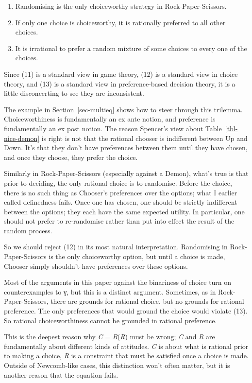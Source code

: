 \documentclass[
  11pt,
  letterpaper,
  DIV=11,
  numbers=noendperiod,
  twoside]{scrartcl}
\providecommand{\tightlist}{%
  \setlength{\itemsep}{0pt}\setlength{\parskip}{0pt}}
\begin{document}
\begin{enumerate}
\def\labelenumi{(\arabic{enumi})}
\setcounter{enumi}{10}
\tightlist
\item
  Randomising is the only choiceworthy strategy in Rock-Paper-Scissors.
\item
  If only one choice is choiceworthy, it is rationally preferred to all
  other choices.
\item
  It is irrational to prefer a random mixture of some choices to every
  one of the choices.
\end{enumerate}

Since (11) is a standard view in game theory, (12) is a standard view in
choice theory, and (13) is a standard view in preference-based decision
theory, it is a little disconcerting to see they are inconsistent.

The example in Section~\ref{sec-multieq} shows how to steer through this
trilemma. Choiceworthiness is fundamentally an ex ante notion, and
preference is fundamentally an ex post notion. The reason Spencer's view
about Table~\ref{tbl-nice-demon} is right is not that the rational
chooser is indifferent between Up and Down. It's that they don't have
preferences between them until they have chosen, and once they choose,
they prefer the choice.

Similarly in Rock-Paper-Scissors (especially against a Demon), what's
true is that prior to deciding, the only rational choice is to
randomise. Before the choice, there is no such thing as Chooser's
preferences over the options; what I earlier called definedness fails.
Once one has chosen, one should be strictly indifferent between the
options; they each have the same expected utility. In particular, one
should not prefer to re-randomise rather than put into effect the result
of the random process.

So we should reject (12) in its most natural interpretation. Randomising
in Rock-Paper-Scissors is the only choiceworthy option, but until a
choice is made, Chooser simply shouldn't have preferences over these
options.

Most of the arguments in this paper against the binariness of choice
turn on counterexamples to γ, but this is a distinct argument.
Sometimes, as in Rock-Paper-Scissors, there are grounds for rational
choice, but no grounds for rational preference. The only preferences
that would ground the choice would violate (13). So rational
choiceworthiness cannot be grounded in rational preference.

This is the deepest reason why \emph{C} = \emph{B}(\emph{R}) must be
wrong; \emph{C} and \emph{R} are fundamentally about different kinds of
attitudes. \emph{C} is about what is rational prior to making a choice,
\emph{R} is a constraint that must be satisfied once a choice is made.
Outside of Newcomb-like cases, this distinction won't often matter, but
it is another reason that the equation fails.
\end{document}
